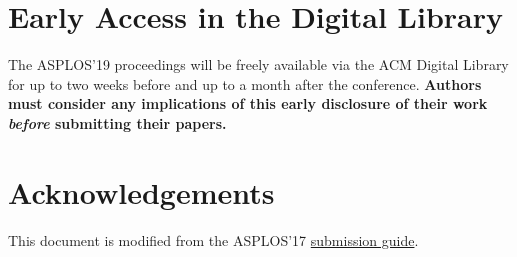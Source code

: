 \documentclass[pageno]{jpaper}
\begin{document}
%
%
%

\section{Early Access in the Digital Library}

The ASPLOS'19 proceedings will be freely available via the ACM Digital
Library for up to two weeks before and up to a month after the
conference. {\bf Authors must consider any implications of this early
disclosure of their work {\em before} submitting their papers.}


\section{Acknowledgements}

This document is modified from the ASPLOS'17 \href{http://novel.ict.ac.cn/ASPLOS2017/files/asplos17-template.pdf}{submission guide}.



\end{document}
